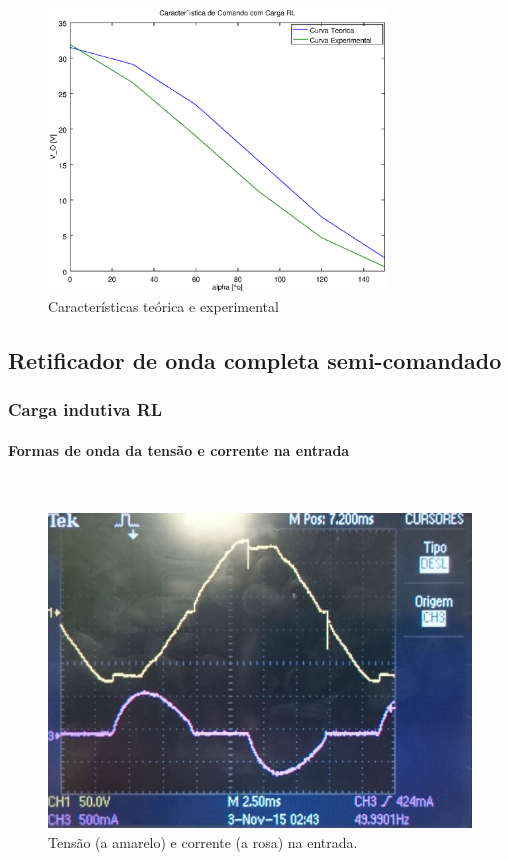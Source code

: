 \documentclass[a4paper,11pt]{article}
\numberwithin{equation}{section}
\begin{document}
\begin{figure}[H]
	\centering
	\includegraphics[keepaspectratio=true, width=0.8\textwidth]{img/comando2}
	\caption{Características teórica e experimental}
	\label{fig:comando2}
	\vspace{-0.8em}
\end{figure}

\subsection{Retificador de onda completa semi-comandado}

\subsubsection{Carga indutiva RL}

\paragraph{Formas de onda da tensão e corrente na entrada} \mbox{}\

\begin{figure}[H]
	\centering
	\includegraphics[keepaspectratio=true, scale=0.12]{img/DSC_0190}
	\caption{Tensão (a amarelo) e corrente (a rosa) na entrada.}
	\label{fig:tcentradasemi}
	\vspace{-0.8em}
\end{figure}
\end{document}
